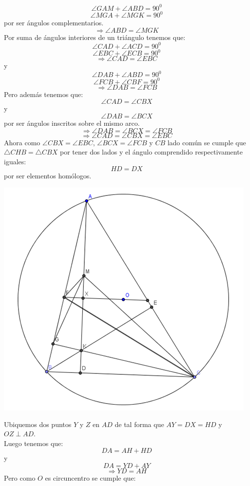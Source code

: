 \documentclass{book}
\begin{document}
\begin{enumerate}
        $$\angle GAM+\angle ABD=90^0$$
        $$\angle MGA+\angle MGK=90^0$$
        por ser ángulos complementarios.
        $$\Rightarrow\angle ABD=\angle MGK$$
        Por suma de ángulos interiores de un triángulo tenemos que:
        $$\angle CAD+\angle ACD=90^0$$
        $$\angle EBC+\angle ECB=90^0$$
        $$\Rightarrow\angle CAD=\angle EBC$$
        y
        $$\angle DAB+\angle ABD=90^0$$
        $$\angle FCB+\angle CBF=90^0$$
        $$\Rightarrow\angle DAB=\angle FCB$$
        Pero además tenemos que:
        $$\angle CAD=\angle CBX$$
        y
        $$\angle DAB=\angle BCX$$
        por ser ángulos inscritos sobre el mismo arco.
        $$\Rightarrow\angle DAB=\angle BCX=\angle FCB$$
        $$\Rightarrow\angle CAD=\angle CBX=\angle EBC$$
        Ahora como $\angle CBX=\angle EBC$, $\angle BCX=\angle FCB$ y $CB$ lado común se cumple que $\triangle CHB=\triangle CBX$ por tener dos lados y el ángulo comprendido respectivamente iguales:
        $$HD=DX$$
        por ser elementos homólogos.
        \begin{center}
            \includegraphics[scale=1]{imagenes/Geometria/21,2.png}
        \end{center}
        Ubiquemos dos puntos $Y$ y $Z$ en $AD$ de tal forma que $AY=DX=HD$ y $OZ\perp AD$.\\ Luego tenemos que:
        $$DA=AH+HD$$
        y
        $$DA=YD+AY$$
        $$\Rightarrow YD=AH$$
        Pero como $O$ es circuncentro se cumple que:

\end{enumerate}
\end{document}
